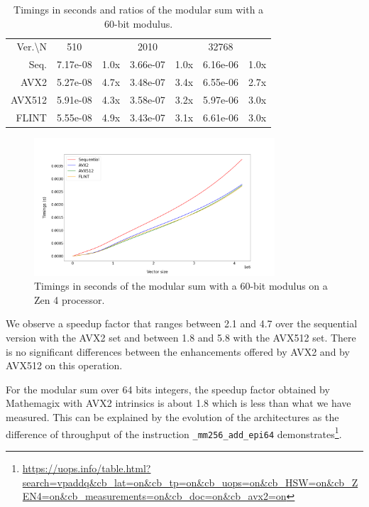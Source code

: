 \documentclass[a4paper]{article}
\begin{document}
\begin{table}[h!]
    \begin{tabular}{|r|*{3}{c c|}}
        \hline
        \rowcolor{myGray}
        \multicolumn{7}{|c|}{\textsc{Zen 4}} \\
        \hline
        \rowcolor{myGray}
        Ver.\textbackslash N & 510 & & 2010 & & 32768 & \\
        \hline
        \cellcolor{myGray} Seq. & 7.17e-08 & 1.0x & 3.66e-07 & 1.0x & 6.16e-06 & 1.0x \\
        \hline
        \cellcolor{myGray} AVX2 & 5.27e-08 & 4.7x & 3.48e-07 & 3.4x & 6.55e-06 & 2.7x \\
        \hline
        \cellcolor{myGray} AVX512 & 5.91e-08 & 4.3x & 3.58e-07 & 3.2x & 5.97e-06 & 3.0x \\
        \hline
        \cellcolor{myGray} FLINT & 5.55e-08 & 4.9x & 3.43e-07 & 3.1x & 6.61e-06 & 3.0x \\
        \hline
    \end{tabular}
    \caption{Timings in seconds and ratios of the modular sum with a 60-bit modulus.}
\end{table}

\begin{figure}[h!]
    \begin{center}
        \includegraphics[width=0.8\textwidth]{add-mod_argiope.png}
    \end{center}
    \caption{Timings in seconds of the modular sum with a 60-bit modulus on a Zen 4 processor.}
\end{figure}

\newpage
We observe a speedup factor that ranges between 2.1 and 4.7 over the sequential version with the AVX2 set
and between 1.8 and 5.8 with the AVX512 set.
There is no significant differences between the enhancements offered by AVX2 and by AVX512 on this operation.

For the modular sum over 64 bits integers, the speedup factor obtained by Mathemagix with AVX2 intrinsics is about 1.8
which is less than what we have measured. 
This can be explained by the evolution of the architectures as the difference of throughput of the instruction
\texttt{\_mm256\_add\_epi64} demonstrates\footnote{\url{https://uops.info/table.html?search=vpaddq&cb_lat=on&cb_tp=on&cb_uops=on&cb_HSW=on&cb_ZEN4=on&cb_measurements=on&cb_doc=on&cb_avx2=on}}.
\end{document}
